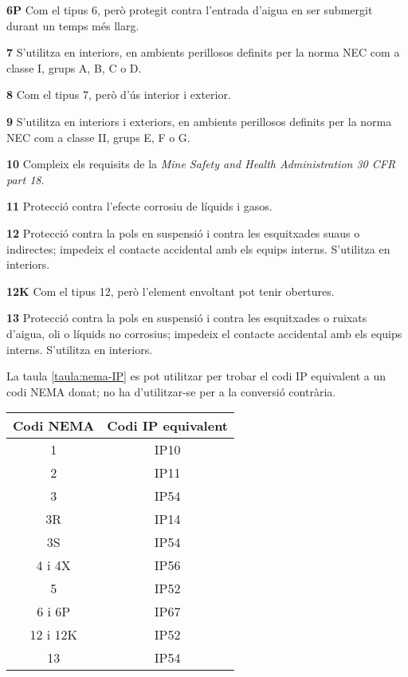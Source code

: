 \begin{list}{}
   \item[\textbf{6P}] Com el tipus 6, però protegit contra l'entrada d'aigua en ser submergit durant un temps més llarg.
   \item[\textbf{7}] S'utilitza en interiors, en ambients perillosos definits per la norma NEC com a classe I, grups A, B, C o D.
   \item[\textbf{8}] Com el tipus 7, però d'ús interior i exterior.
   \item[\textbf{9}] S'utilitza en interiors i exteriors, en ambients perillosos definits per la norma NEC com a classe II, grups E, F o G.
   \item[\textbf{10}] Compleix els requisits de la \textit{Mine Safety and Health Administration 30 CFR part 18}.
   \item[\textbf{11}] Protecció contra l'efecte corrosiu de líquids i gasos.
   \item[\textbf{12}] Protecció contra la pols en suspensió i contra les esquitxades suaus o indirectes; impedeix el contacte accidental amb els equips interns. S'utilitza en interiors.
   \item[\textbf{12K}] Com el tipus 12, però l'element envoltant pot tenir obertures.
   \item[\textbf{13}] Protecció contra la pols en suspensió i contra les esquitxades o ruixats d'aigua, oli o líquids no corrosius; impedeix el contacte accidental amb els equips interns. S'utilitza en interiors.
\end{list}



La taula \vref{taula:nema-IP} es pot utilitzar per trobar el codi IP equivalent a un codi NEMA donat; no ha d'utilitzar-se per a la conversió contrària.

\begin{center}
   \label{taula:nema-IP}
   \begin{tabular}{cc}
   \toprule[1pt]
   Codi NEMA & Codi IP equivalent \\
   \midrule
   1 & IP10 \\
   2 & IP11 \\
   3 & IP54 \\
   3R & IP14 \\
   3S & IP54 \\
   4 i 4X & IP56 \\
   5 & IP52 \\
   6 i 6P & IP67\\
   12 i 12K & IP52 \\
   13 & IP54 \\
   \bottomrule[1pt]
   \end{tabular}
\end{center}


